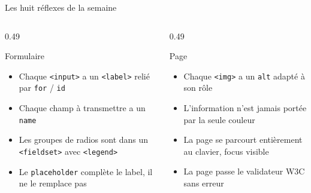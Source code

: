 \documentclass[aspectratio=169,11pt]{beamer}
\begin{document}
\begin{frame}{Les huit réflexes de la semaine}
  \begin{columns}[T]
    \begin{column}{0.49\textwidth}
      \begin{block}{Formulaire}
        \begin{itemize}
          \item Chaque \texttt{<input>} a un \texttt{<label>} relié par \texttt{for} / \texttt{id}
          \item Chaque champ à transmettre a un \texttt{name}
          \item Les groupes de radios sont dans un \texttt{<fieldset>} avec \texttt{<legend>}
          \item Le \texttt{placeholder} complète le label, il ne le remplace pas
        \end{itemize}
      \end{block}
    \end{column}
    \begin{column}{0.49\textwidth}
      \begin{exampleblock}{Page}
        \begin{itemize}
          \item Chaque \texttt{<img>} a un \texttt{alt} adapté à son rôle
          \item L'information n'est jamais portée par la seule couleur
          \item La page se parcourt entièrement au clavier, focus visible
          \item La page passe le validateur W3C sans erreur
        \end{itemize}
      \end{exampleblock}
    \end{column}
  \end{columns}
\end{frame}
\end{document}
